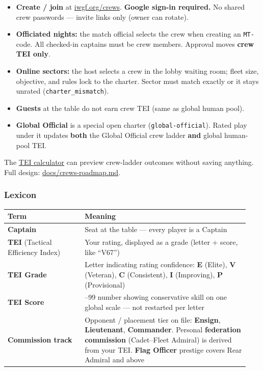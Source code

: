 \documentclass[11pt]{article}
\providecommand{\tightlist}{%
  \setlength{\itemsep}{0pt}\setlength{\parskip}{0pt}}
\begin{document}
\begin{itemize}
\tightlist
\item
  \textbf{Create / join} at
  \href{https://iwgf.org/crews}{iwgf.org/crews}. \textbf{Google sign-in
  required.} No shared crew passwords --- invite links only (owner can
  rotate).
\item
  \textbf{Officiated nights:} the match official selects the crew when
  creating an \texttt{MT-} code. All checked-in captains must be crew
  members. Approval moves \textbf{crew TEI only}.
\item
  \textbf{Online sectors:} the host selects a crew in the lobby waiting
  room; fleet size, objective, and rules lock to the charter. Sector
  must match exactly or it stays unrated (\texttt{charter\_mismatch}).
\item
  \textbf{Guests} at the table do not earn crew TEI (same as global
  human pool).
\item
  \textbf{Global Official} is a special open charter
  (\texttt{global-official}). Rated play under it updates \textbf{both}
  the Global Official crew ladder \textbf{and} global human-pool TEI.
\end{itemize}

The \href{https://iwgf.org/calculator}{TEI calculator} can preview
crew-ladder outcomes without saving anything. Full design:
\url{docs/crews-roadmap.md}.

\subsubsection{Lexicon}\label{lexicon}

\begin{longtable}[]{@{}>{\raggedright\arraybackslash}p{0.30\linewidth}>{\raggedright\arraybackslash}p{0.64\linewidth}@{}}
\toprule\noalign{}
Term & Meaning \\
\midrule\noalign{}
\endhead
\bottomrule\noalign{}
\endlastfoot
\textbf{Captain} & Seat at the table --- every player is a Captain \\
\textbf{TEI} (Tactical Efficiency Index) & Your rating, displayed as a grade (letter + score, like ``V67'') \\
\textbf{TEI Grade} & Letter indicating rating confidence: \textbf{E} (Elite), \textbf{V} (Veteran), \textbf{C} (Consistent), \textbf{I} (Improving), \textbf{P} (Provisional) \\
\textbf{TEI Score} & 0--99 number showing conservative skill on one global scale --- not restarted per letter \\
\textbf{Commission track} & Opponent / placement tier on file: \textbf{Ensign}, \textbf{Lieutenant}, \textbf{Commander}. Personal \textbf{federation commission} (Cadet--Fleet Admiral) is derived from your TEI. \textbf{Flag Officer} prestige covers Rear Admiral and above \\
\end{longtable}
\end{document}
